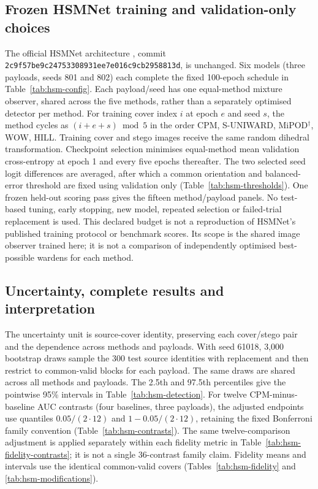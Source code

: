 \documentclass[journal]{IEEEtran}
\theoremstyle{definition}
\theoremstyle{game}
\begin{document}
\subsection{Frozen HSMNet training and validation-only choices}
The official HSMNet architecture \cite{Yang2026HSMNet}, commit
\texttt{2c9f57be9c24753308931ee7e016c9cb2958813d}, is unchanged. Six
models (three payloads, seeds 801 and 802) each complete the fixed
100-epoch schedule in Table~\ref{tab:hsm-config}. Each payload/seed has
one equal-method mixture observer, shared across the five methods, rather
than a separately optimised detector per method. For training cover index
$i$ at epoch $e$ and seed $s$, the method cycles as $(i+e+s)\bmod5$ in
the order CPM, S-UNIWARD, MiPOD$^\dagger$, WOW, HILL. Training cover and
stego images receive the same random dihedral transformation. Checkpoint
selection minimises equal-method mean validation cross-entropy at epoch
1 and every five epochs thereafter. The two selected seed logit
differences are averaged, after which a common orientation and
balanced-error threshold are fixed using validation only
(Table~\ref{tab:hsm-thresholds}). One frozen held-out scoring pass gives
the fifteen method/payload panels. No test-based tuning, early stopping,
new model, repeated selection or failed-trial replacement is used.
This declared budget is not a reproduction of HSMNet's published
training protocol or benchmark scores. Its scope is the shared image
observer trained here; it is not a comparison of independently optimised
best-possible wardens for each method.

\subsection{Uncertainty, complete results and interpretation}
The uncertainty unit is source-cover identity, preserving each
cover/stego pair and the dependence across methods and payloads. With
seed 61018, 3,000 bootstrap draws sample the 300 test source identities
with replacement and then restrict to common-valid blocks for each
payload. The same draws are shared across all methods and payloads.
The 2.5th and 97.5th percentiles give the pointwise 95\% intervals in
Table~\ref{tab:hsm-detection}. For twelve CPM-minus-baseline AUC
contrasts (four baselines, three payloads), the adjusted endpoints use
quantiles $0.05/(2\cdot12)$ and $1-0.05/(2\cdot12)$, retaining the fixed
Bonferroni family convention (Table~\ref{tab:hsm-contrasts}). The same
twelve-comparison adjustment is applied separately within each fidelity
metric in Table~\ref{tab:hsm-fidelity-contrasts}; it is not a single
36-contrast family claim. Fidelity means and intervals use the identical
common-valid covers (Tables~\ref{tab:hsm-fidelity} and
\ref{tab:hsm-modifications}).
\end{document}
